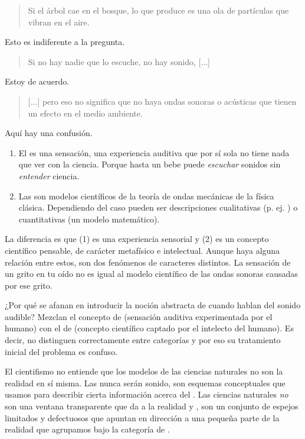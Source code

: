 \documentclass[12pt]{article}
\begin{document}
	\blockquote[]{Si el árbol cae en el bosque, lo que produce es una ola de
	partículas que vibran en el aire.}
	
	Esto es indiferente a la pregunta.
	
	\blockquote[]{Si no hay nadie que lo escuche, no hay sonido, [...]}

	Estoy de acuerdo.

	\blockquote[]{[...] pero eso no significa que no haya ondas sonoras o
	acústicas que tienen un efecto en el medio ambiente.}
	
	Aquí hay una confusión.

	\begin{enumerate}
	\item El  es una sensación, una experiencia auditiva
		que por sí sola no tiene nada que ver con la ciencia. Porque
			hasta un bebe puede \textit{escuchar} sonidos sin
			\textit{entender} ciencia.
	
	\item Las  son modelos científicos
		de la teoría de ondas mecánicas de la física clásica.
		Dependiendo del caso pueden ser descripciones cualitativas (p.
		ej. ) o
		cuantitativas (un modelo matemático).
	\end{enumerate}

	La diferencia es que (1) es una experiencia sensorial y (2) es un
	concepto científico pensable, de carácter metafísico e intelectual.
	Aunque haya alguna relación entre estos, son dos fenómenos de caracteres
	distintos. La sensación de un grito en tu oído no es igual al modelo
	científico de las ondas sonoras causadas por ese grito.
	
	¿Por qué se afanan en introducir la noción abstracta de  cuando hablan del sonido audible? Mezclan el concepto de
	 (sensación auditiva experimentada por el humano) con
	el de  (concepto científico captado por el
	intelecto del humano). Es decir, no distinguen correctamente entre
	categorías y por eso su tratamiento inicial del problema es confuso.
	
	El cientifismo no entiende que los modelos de las ciencias naturales no
	son la realidad en sí misma. Las  nunca serán
	sonido, son esquemas conceptuales que usamos para describir cierta
	información acerca del . Las ciencias naturales
	\textit{no} son una ventana transparente que da a la realidad
	 y , son un conjunto de espejos
	limitados y defectuosos que apuntan en dirección a una pequeña parte de
	la realidad que agrupamos bajo la categoría de .
	
\end{document}
